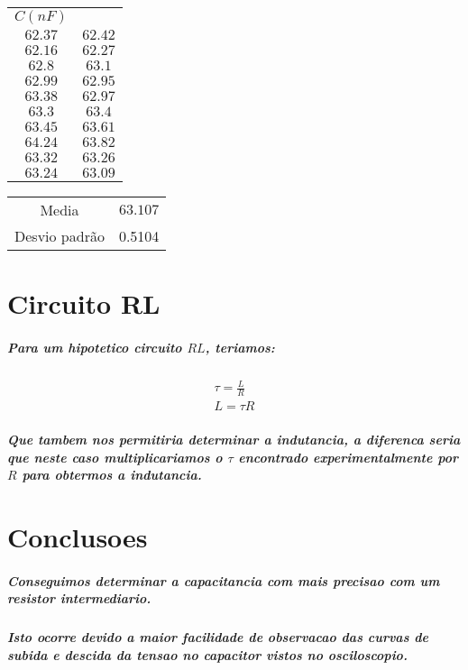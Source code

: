 \documentclass[12pt,twoside, a4paper, twocolumn]{article}
\begin{document}
\begin{center}
    \begin{tabular}{ |cc| }
        \hline
        $ C (nF)$         \\
        $62.37$ & $62.42$ \\
        $62.16$ & $62.27$ \\
        $62.8$  & $63.1$  \\
        $62.99$ & $62.95$ \\
        $63.38$ & $62.97$ \\
        $63.3$  & $63.4$  \\
        $63.45$ & $63.61$ \\
        $64.24$ & $63.82$ \\
        $63.32$ & $63.26$ \\
        $63.24$ & $63.09$ \\
        \hline
    \end{tabular}
\end{center}

\begin{center}
    \begin{tabular}{ |cc| }
        \hline
        Media         & $63.107$ \\
        Desvio padrão & 0.5104   \\
        \hline
    \end{tabular}
\end{center}

\section{Circuito RL}

\subparagraph*{Para um hipotetico circuito $RL$, teriamos:}

\begin{equation}
    \begin{aligned}
        \tau = \frac{L}{R} \\
        L = \tau R
    \end{aligned}
\end{equation}

\subparagraph*{Que tambem nos permitiria determinar a indutancia, a diferenca seria que neste caso multiplicariamos o $\tau$ encontrado experimentalmente por $R$ para obtermos a indutancia.}

\section{Conclusoes}

\subparagraph*{Conseguimos determinar a capacitancia com mais precisao com um resistor intermediario.}

\subparagraph*{Isto ocorre devido a maior facilidade de observacao das curvas de subida e descida da tensao no capacitor vistos no osciloscopio.}
\end{document}

